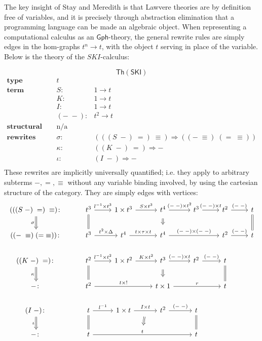 \documentclass{amsart}
\theoremstyle{definition}
\newcommand{\Th}{\mathsf{Th}}
\newcommand{\Gph}{\mathsf{Gph}}
\newcommand{\maps}{\colon}
\begin{document}
The key insight of Stay and Meredith \cite{roswelt} is that Lawvere theories are by definition free of variables, and it is precisely through abstraction elimination that a programming language can be made an algebraic object. When representing a computational calculus as an $\Gph$-theory, the general rewrite rules are simply edges in the hom-graphs $t^n \to t$, with the object $t$ serving in place of the variable. Below is the theory of the $SKI$-calculus:

$$\Th(\mathsf{SKI})$$
\[\begin{array}{rcl}
\textbf{type} & t &\\
\textbf{term constructors} & S\maps & 1 \to t\\
& K\maps & 1 \to t\\
& I\maps & 1 \to t\\
& (-\; -)\maps &  t^2 \to t\\
\textbf{structural congruence} & \text{n/a} &\\
\textbf{rewrites} & \sigma\maps & (((S\; -)\; =)\; \equiv) \Rightarrow ((-\; \equiv)\; (=\; \equiv))\\
& \kappa\maps & ((K\; -)\; =) \Rightarrow -\\
& \iota\maps & (I\; -) \Rightarrow -\\
\end{array}\]
These rewrites are implicitly universally quantified; i.e. they apply to arbitrary subterms $-, =, \equiv$ without any variable binding involved, by using the cartesian structure of the category. They are simply edges with vertices:
\[\begin{tikzcd}
(((S\; -)\; =)\; \equiv)\maps \arrow[Rightarrow,d,swap,"\sigma"] & t^3 \arrow[d,equal] \arrow[r,"l^{-1} \times t^3"] & 1\times t^3 \arrow[r,"S \times t^3"] & t^4 \arrow[Rightarrow,d,shorten >=0.2cm,shorten <=0.2cm] \arrow[r,"(-\;-)\times t^2"] & t^3 \arrow[r,"(-\;-) \times t"] & t^2 \arrow[r,"(-\;-)"] & t\arrow[d,equal]\\
((-\; \equiv)\; (=\; \equiv))\maps & t^3 \arrow[r,"t^2 \times \Delta"] & t^4 \arrow[r,"t \times \tau \times t"]& t^4 \arrow[rr,"(-\;-) \times (-\;-)"]&& t^2 \arrow[r,"(-\;-)"]& t\\
((K\; -)\; =)\maps \arrow[Rightarrow,d,swap,"\kappa"] & t^2 \arrow[d,equal] \arrow[r,"l^{-1} \times t^2"] & 1\times t^2 \arrow[r,"K \times t^2"] & t^3 \arrow[Rightarrow,d,shorten >=0.2cm,shorten <=0.2cm] \arrow[r,"(-\;-)\times t"] & t^2 \arrow[r,"(-\;-)"] & t \arrow[d,equal]\\
-\maps & t^2 \arrow[rr,"t \times !"] && t \times 1 \arrow[rr,"r"] && t\\
(I\; -)\maps \arrow[Rightarrow,d,swap,"\iota"] & t \arrow[d,equal] \arrow[r,"l^{-1}"] & 1\times t \arrow[r,"I \times t",""name=1] & t^2 \arrow[r,"(-\;-)"] & t \arrow[d,equal]\\
-\maps & t \arrow[rrr,"t",""name=2] \arrow[Rightarrow,from=1,to=2,shorten >=0.3cm,shorten <=0.3cm] &&& t
\end{tikzcd}\]
\end{document}
